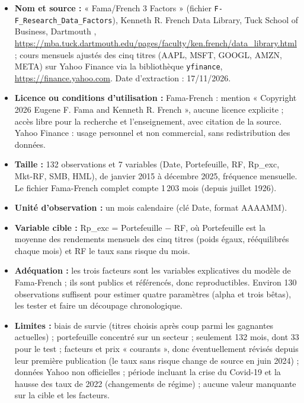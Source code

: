 \documentclass[11pt,a4paper]{article}
\begin{document}
\begin{itemize}[leftmargin=1.2cm]
\item \textbf{Nom et source :} « Fama/French 3 Factors » (fichier \texttt{F-F\_Research\_Data\_Factors}), Kenneth R. French Data Library, Tuck School of Business, Dartmouth \cite{french}, \url{https://mba.tuck.dartmouth.edu/pages/faculty/ken.french/data_library.html} ; cours mensuels ajustés des cinq titres (AAPL, MSFT, GOOGL, AMZN, META) sur Yahoo Finance via la bibliothèque \texttt{yfinance}, \url{https://finance.yahoo.com}. Date d'extraction : 17/11/2026.
\item \textbf{Licence ou conditions d'utilisation :} Fama-French : mention « Copyright 2026 Eugene F. Fama and Kenneth R. French », aucune licence explicite ; accès libre pour la recherche et l'enseignement, avec citation de la source. Yahoo Finance : usage personnel et non commercial, sans redistribution des données.
\item \textbf{Taille :} 132 observations et 7 variables (Date, Portefeuille, RF, Rp\_exc, Mkt-RF, SMB, HML), de janvier 2015 à décembre 2025, fréquence mensuelle. Le fichier Fama-French complet compte 1\,203 mois (depuis juillet 1926).
\item \textbf{Unité d'observation :} un mois calendaire (clé Date, format AAAAMM).
\item \textbf{Variable cible :} Rp\_exc = Portefeuille $-$ RF, où Portefeuille est la moyenne des rendements mensuels des cinq titres (poids égaux, rééquilibrés chaque mois) et RF le taux sans risque du mois.
\item \textbf{Adéquation :} les trois facteurs sont les variables explicatives du modèle de Fama-French ; ils sont publics et référencés, donc reproductibles. Environ 130 observations suffisent pour estimer quatre paramètres (alpha et trois bêtas), les tester et faire un découpage chronologique.
\item \textbf{Limites :} biais de survie (titres choisis après coup parmi les gagnantes actuelles) ; portefeuille concentré sur un secteur ; seulement 132 mois, dont 33 pour le test ; facteurs et prix « courants », donc éventuellement révisés depuis leur première publication (le taux sans risque change de source en juin 2024) ; données Yahoo non officielles ; période incluant la crise du Covid-19 et la hausse des taux de 2022 (changements de régime) ; aucune valeur manquante sur la cible et les facteurs.
\end{itemize}
\end{document}
